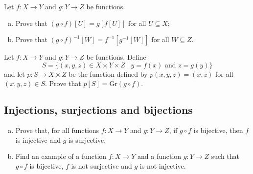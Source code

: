 \begin{chapex}
Let $f : X \to Y$ and $g : Y \to Z$ be functions.
\begin{enumerate}[(a)]
\item Prove that $(g \circ f)[U] = g[f[U]]$ for all $U \subseteq X$;
\item Prove that $(g \circ f)^{-1}[W] = f^{-1}[g^{-1}[W]]$ for all $W \subseteq Z$.
\end{enumerate}
\end{chapex}

\begin{chapex}
Let $f : X \to Y$ and $g : Y \to Z$ be functions. Define
\[ S = \{ (x,y,z) \in X \times Y \times Z \mid y=f(x) \text{ and } z=g(y) \} \]
and let $p : S \to X \times Z$ be the function defined by $p(x,y,z) = (x,z)$ for all $(x,y,z) \in S$. Prove that $p[S]=\mathrm{Gr}(g \circ f)$.
\end{chapex}

\subsection*{Injections, surjections and bijections}

\begin{chapex}
\begin{enumerate}[(a)]
\item Prove that, for all functions $f : X \to Y$ and $g : Y \to Z$, if $g \circ f$ is bijective, then $f$ is injective and $g$ is surjective.
\item Find an example of a function $f : X \to Y$ and a function $g : Y \to Z$ such that $g \circ f$ is bijective, $f$ is not surjective and $g$ is not injective.
\end{enumerate}
\end{chapex}

